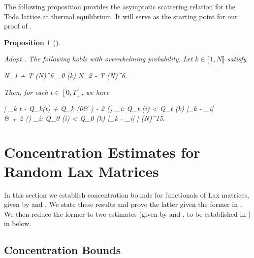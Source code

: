 \documentclass{amsart}
\numberwithin{equation}{section}
\DeclareMathOperator{\sgn}{sgn}
\newtheorem{prop}[thm]{Proposition}
\theoremstyle{remark}
\theoremstyle{definition}
\begin{document}
	
	The following proposition provides the asymptotic scattering relation for the Toda lattice at thermal equilibrium. It will serve as the starting point for our proof of . 
	
	\begin{prop}[{\cite[Theorem 2.11]{LC}}]
		\label{ztlambda2} 
		
		Adopt . The following holds with overwhelming probability. Let $k \in \llbracket 1, N \rrbracket$ satisfy
		\begin{flalign}
			\label{n1n2k02} 
			N_1 + T (\log N)^6 \le \varphi_0 (k) \le N_2 - T (\log N)^6.
		\end{flalign}
		
		\noindent Then, for each $t \in [0, T]$, we have
		\begin{flalign}
			\label{lambdak2}
			\begin{aligned} 
			\Bigg| \lambda_k t - Q_k(t) + Q_k (0& ) - 2 \sgn (\alpha) \displaystyle\sum_{i: Q_t (i) < Q_t (k)}  \log |\lambda_{k} - \lambda_{i}| \\
			& \qquad \quad + 2 \sgn (\alpha) \displaystyle\sum_{i: Q_0 (i) < Q_0 (k)} \log |\lambda_k - \lambda_i| \Bigg| \le (\log N)^{15}.
			\end{aligned}
		\end{flalign} 
		
	\end{prop}  	
	
	
	
	
	
	
	\section{Concentration Estimates for Random Lax Matrices} 
	
	\label{Localization2}
	
	In this section we establish concentration bounds for functionals of Lax matrices, given by  and . We state these results and prove the latter given the former in . We then reduce the former to two estimates (given by  and , to be established in ) in  below. 
	
	\subsection{Concentration Bounds}
	
	\label{MatrixEstimate}
	
\end{document}
